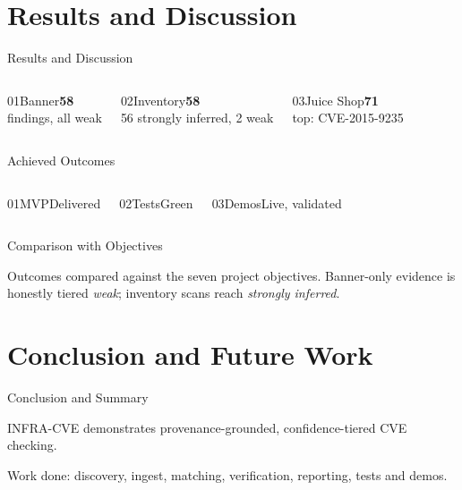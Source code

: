 \documentclass[aspectratio=169,12pt]{beamer}
\newlength{\ch}\setlength{\ch}{47mm}
\begin{document}
\section{Results and Discussion}
\begin{frame}{Results and Discussion}
\setlength{\ch}{50mm}
\begin{columns}[T,onlytextwidth]
\begin{tc}{01}{Banner}{\fontsize{34}{36}\selectfont\bfseries\color{accent}58}\\\normalsize findings, all weak\end{tc}
\begin{tcteal}{02}{Inventory}{\fontsize{34}{36}\selectfont\bfseries\color{accent}58}\\\normalsize 56 strongly inferred, 2 weak\end{tcteal}
\begin{tc}{03}{Juice Shop}{\fontsize{34}{36}\selectfont\bfseries\color{accent}71}\\\normalsize top: CVE-2015-9235\end{tc}
\end{columns}
\end{frame}

\begin{frame}{Achieved Outcomes}
\setlength{\ch}{50mm}
\begin{columns}[T,onlytextwidth]
\begin{tc}{01}{MVP}\large Delivered\end{tc}
\begin{tcteal}{02}{Tests}\large Green\end{tcteal}
\begin{tc}{03}{Demos}\large Live, validated\end{tc}
\end{columns}
\end{frame}

\begin{frame}{Comparison with Objectives}
\begin{stmt}Outcomes compared against the seven project objectives. Banner-only evidence is honestly tiered \emph{weak}; inventory scans reach \emph{strongly inferred}.\end{stmt}
\end{frame}

\section{Conclusion and Future Work}
\begin{frame}{Conclusion and Summary}
\begin{stmt}[height={26mm},height plus=30mm,fontupper=\fontsize{16}{22}\selectfont]INFRA-CVE demonstrates provenance-grounded, confidence-tiered CVE checking.\end{stmt}\vskip2.5mm
\begin{wc}\large Work done: discovery, ingest, matching, verification, reporting, tests and demos.\end{wc}
\end{frame}
\end{document}
